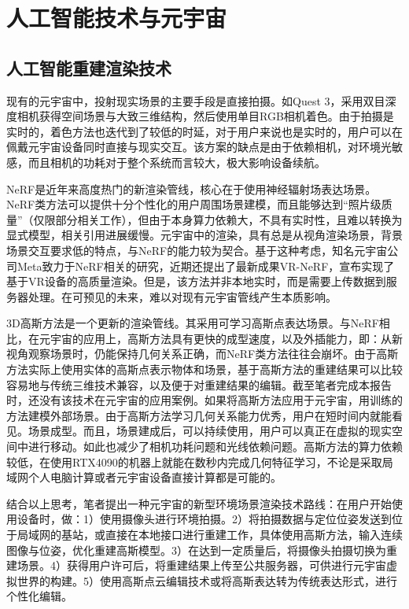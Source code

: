 \documentclass{article}
\begin{document}
	\section{人工智能技术与元宇宙}
	\subsection{人工智能重建渲染技术}
	现有的元宇宙中，投射现实场景的主要手段是直接拍摄。如Quest 3，采用双目深度相机获得空间场景与大致三维结构，然后使用单目RGB相机着色。由于拍摄是实时的，着色方法也迭代到了较低的时延，对于用户来说也是实时的，用户可以在佩戴元宇宙设备同时直接与现实交互。该方案的缺点是由于依赖相机，对环境光敏感，而且相机的功耗对于整个系统而言较大，极大影响设备续航。
	
	NeRF\cite{nerf}是近年来高度热门的新渲染管线，核心在于使用神经辐射场表达场景。NeRF类方法可以提供十分个性化的用户周围场景建模，而且能够达到“照片级质量”（仅限部分相关工作），但由于本身算力依赖大，不具有实时性，且难以转换为显式模型，相关引用进展缓慢。元宇宙中的渲染，具有总是从视角渲染场景，背景场景交互要求低的特点，与NeRF的能力较为契合。基于这种考虑，知名元宇宙公司Meta致力于NeRF相关的研究，近期还提出了最新成果VR-NeRF\cite{vrnerf}，宣布实现了基于VR设备的高质量渲染。但是，该方法并非本地实时，而是需要上传数据到服务器处理。在可预见的未来，难以对现有元宇宙管线产生本质影响。
	
	3D高斯方法\cite{3dgs}是一个更新的渲染管线。其采用可学习高斯点表达场景。与NeRF相比，在元宇宙的应用上，高斯方法具有更快的成型速度，以及外插能力，即：从新视角观察场景时，仍能保持几何关系正确，而NeRF类方法往往会崩坏。由于高斯方法实际上使用实体的高斯点表示物体和场景，基于高斯方法的重建结果可以比较容易地与传统三维技术兼容，以及便于对重建结果的编辑。截至笔者完成本报告时，还没有该技术在元宇宙的应用案例。如果将高斯方法应用于元宇宙，用训练的方法建模外部场景。由于高斯方法学习几何关系能力优秀，用户在短时间内就能看见。场景成型。而且，场景建成后，可以持续使用，用户可以真正在虚拟的现实空间中进行移动。如此也减少了相机功耗问题和光线依赖问题。高斯方法的算力依赖较低，在使用RTX4090的机器上就能在数秒内完成几何特征学习，不论是采取局域网个人电脑计算或者元宇宙设备直接计算都是可能的。
	
	结合以上思考，笔者提出一种元宇宙的新型环境场景渲染技术路线：在用户开始使用设备时，做：1）使用摄像头进行环境拍摄。2）将拍摄数据与定位位姿发送到位于局域网的基站，或直接在本地接口进行重建工作，具体使用高斯方法，输入连续图像与位姿，优化重建高斯模型。3）在达到一定质量后，将摄像头拍摄切换为重建场景。4）获得用户许可后，将重建结果上传至公共服务器，可供进行元宇宙虚拟世界的构建。5）使用高斯点云编辑技术或将高斯表达转为传统表达形式，进行个性化编辑。
\end{document}
